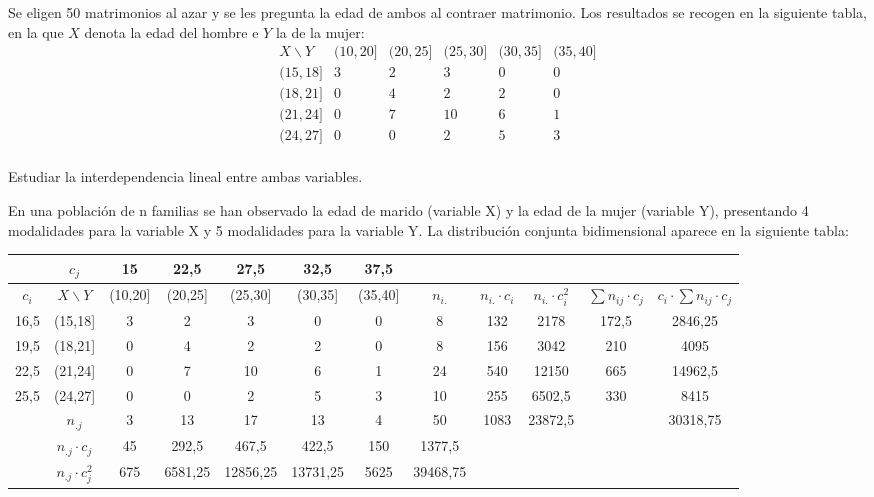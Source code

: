 \problem

Se eligen  50 matrimonios al azar  y se les pregunta  la  edad de
ambos al contraer matrimonio. Los resultados se recogen en la  siguiente tabla, en la que $X$
denota la edad del hombre e $Y$ la de la mujer:
$$
\begin{array}{c|ccccc}
X  \backslash  Y & (10,20] & (20,25] & (25,30] & (30,35] & (35,40] \\ \hline
(15,18]  &   3   &   2   &   3   &   0   &   0   \\
(18,21]  &   0   &   4   &   2   &   2   &   0   \\
(21,24]  &   0   &   7   &   10  &   6   &   1   \\
(24,27]  &   0   &   0   &   2   &   5   &   3    \\
\end{array}
$$

\subproblem

Estudiar la interdependencia lineal entre ambas variables.

En una población de n familias se han observado la edad de marido (variable X) y la edad de la mujer (variable Y), presentando 4 modalidades para la variable X y 5 modalidades para la variable Y. La distribución conjunta bidimensional aparece en la siguiente tabla:

\tiny
	\begin{center}
		\begin{tabular}{ c|c|c c c c c|c c c c c|}
			
			& $c_j$  & 15 & 22,5 & 27,5 & 32,5 & 37,5 &  &  &  &  &  \\ \hline
			$c_i$ & $X \backslash Y$ & (10,20] & (20,25] & (25,30] & (30,35] & (35,40] & $n_{i.}$  & $n_{i.}·c_i$  &  $n_{i.}·c_i^2$ & $\sum n_{ij}·c_j$  & $c_i·\sum n_{ij}·c_j$ \\ \hline
			16,5 & (15,18] & 3 & 2 & 3 & 0 & 0 & 8 & 132 & 2178 & 172,5 & 2846,25 \\ 
			19,5 & (18,21] & 0 & 4 & 2 & 2 & 0 & 8 & 156 & 3042 & 210 & 4095 \\ 
			22,5 & (21,24] & 0 & 7 & 10 & 6 & 1 & 24 & 540 & 12150 & 665 & 14962,5 \\ 
			25,5 & (24,27] & 0 & 0 & 2 & 5 & 3 & 10 & 255 & 6502,5 & 330 & 8415 \\ \hline
			& $n_{.j}$ & 3 & 13 & 17 & 13 & 4 & 50 & 1083 & 23872,5 &  & 30318,75 \\ 
			& $n_{.j}·c_j$ & 45 & 292,5 & 467,5 & 422,5 & 150 & 1377,5 &  &  &  &  \\ 
			& $n_{.j}·c_j^2$ & 675 & 6581,25 & 12856,25 & 13731,25 & 5625 & 39468,75 &  &  &  &  
		\end{tabular}
	\end{center}

